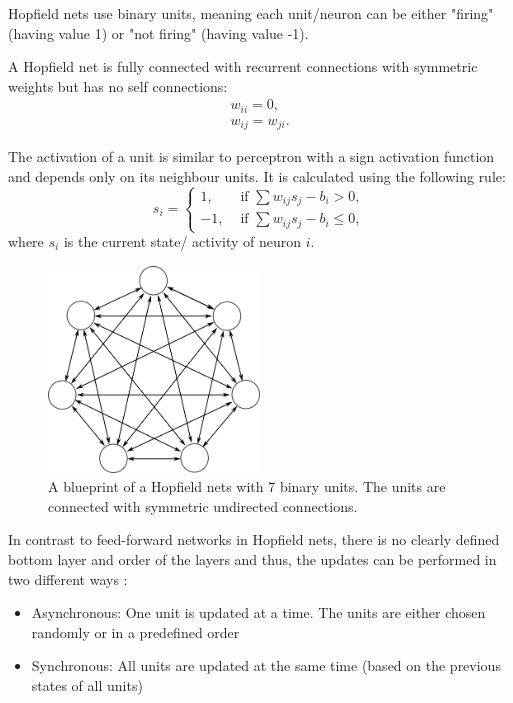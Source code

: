 Hopfield nets use binary units, meaning each unit/neuron can be either "firing" (having value 1) or "not firing" (having value -1). 

A Hopfield net  is fully connected with recurrent connections with symmetric weights but has no self connections:
\[
\begin{split}
w_{ii} = 0 , \\
w_{ij} = w_{ji} .
\end{split}
\]

The activation of a unit is similar to perceptron with a sign activation function and depends only on its neighbour units. It is calculated using the following rule:
\[
	s_i = 
		\begin{cases}
			1, & \text{  if  } \sum w_{ij} s_{j} - b_{i}> 0 , \\
			-1, & \text{  if  } \sum w_{ij} s_{j} - b_{i} \le 0,
		\end{cases}	
\]
where $s_i$ is the current state/ activity of neuron $i$.

\begin{figure}
	\centering
    	\includegraphics[width=0.5\textwidth]{imgs/hopfield.png} 
    \caption[A blueprint of a Hopfield nets with 7 binary units.]{A blueprint of a Hopfield nets with 7 binary units. The units are connected with symmetric undirected connections.}
	\label{fig:hopfiled}
\end{figure}


In contrast to feed-forward networks in Hopfield nets, there is no clearly defined bottom layer and order of the layers and thus, the updates can be performed in two different ways :
\begin{itemize}
\item Asynchronous: One unit is updated at a time. The units are either chosen randomly or in a predefined order
\item Synchronous: All units are updated at the same time (based on the previous states of all units)
\end{itemize}

